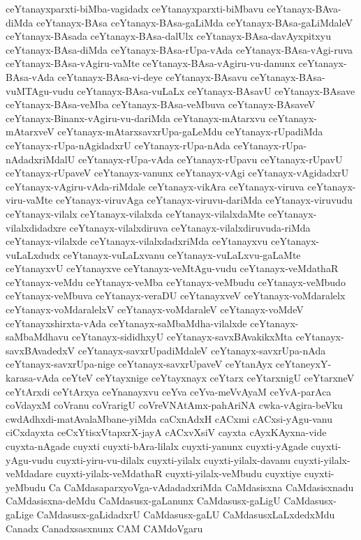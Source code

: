 {ceYtanayxparxti-biMba-vagidadx
ceYtanayxparxti-biMbavu
ceYtanayx-BAva-diMda
ceYtanayx-BAsa
ceYtanayx-BAsa-gaLiMda
ceYtanayx-BAsa-gaLiMdaleV
ceYtanayx-BAsada
ceYtanayx-BAsa-dalUlx
ceYtanayx-BAsa-davAyxpitxyu
ceYtanayx-BAsa-diMda
ceYtanayx-BAsa-rUpa-vAda
ceYtanayx-BAsa-vAgi-ruva
ceYtanayx-BAsa-vAgiru-vaMte
ceYtanayx-BAsa-vAgiru-vu-danunx
ceYtanayx-BAsa-vAda
ceYtanayx-BAsa-vi-deye
ceYtanayx-BAsavu
ceYtanayx-BAsa-vuMTAgu-vudu
ceYtanayx-BAsa-vuLaLx
ceYtanayx-BAsavU
ceYtanayx-BAsave
ceYtanayx-BAsa-veMba
ceYtanayx-BAsa-veMbuva
ceYtanayx-BAsaveV
ceYtanayx-Binanx-vAgiru-vu-dariMda
ceYtanayx-mAtarxvu
ceYtanayx-mAtarxveV
ceYtanayx-mAtarxsavxrUpa-gaLeMdu
ceYtanayx-rUpadiMda
ceYtanayx-rUpa-nAgidadxrU
ceYtanayx-rUpa-nAda
ceYtanayx-rUpa-nAdadxriMdalU
ceYtanayx-rUpa-vAda
ceYtanayx-rUpavu
ceYtanayx-rUpavU
ceYtanayx-rUpaveV
ceYtanayx-vanunx
ceYtanayx-vAgi
ceYtanayx-vAgidadxrU
ceYtanayx-vAgiru-vAda-riMdale
ceYtanayx-vikAra
ceYtanayx-viruva
ceYtanayx-viru-vaMte
ceYtanayx-viruvAga
ceYtanayx-viruvu-dariMda
ceYtanayx-viruvudu
ceYtanayx-vilalx
ceYtanayx-vilalxda
ceYtanayx-vilalxdaMte
ceYtanayx-vilalxdidadxre
ceYtanayx-vilalxdiruva
ceYtanayx-vilalxdiruvuda-riMda
ceYtanayx-vilalxde
ceYtanayx-vilalxdadxriMda
ceYtanayxvu
ceYtanayx-vuLaLxdudx
ceYtanayx-vuLaLxvanu
ceYtanayx-vuLaLxvu-gaLaMte
ceYtanayxvU
ceYtanayxve
ceYtanayx-veMtAgu-vudu
ceYtanayx-veMdathaR
ceYtanayx-veMdu
ceYtanayx-veMba
ceYtanayx-veMbudu
ceYtanayx-veMbudo
ceYtanayx-veMbuva
ceYtanayx-veraDU
ceYtanayxveV
ceYtanayx-voMdaralelx
ceYtanayx-voMdaralelxV
ceYtanayx-voMdaraleV
ceYtanayx-voMdeV
ceYtanayxshirxta-vAda
ceYtanayx-saMbaMdha-vilalxde
ceYtanayx-saMbaMdhavu
ceYtanayx-sididhxyU
ceYtanayx-savxBAvakikxMta
ceYtanayx-savxBAvadedxV
ceYtanayx-savxrUpadiMdaleV
ceYtanayx-savxrUpa-nAda
ceYtanayx-savxrUpa-nige
ceYtanayx-savxrUpaveV
ceYtanAyx
ceYtaneyxY-karasa-vAda
ceYteV
ceYtayxnige
ceYtayxnayx
ceYtarx
ceYtarxnigU
ceYtarxneV
ceYtArxdi
ceYtArxya
ceYnanayxvu
ceYva
ceYva-meVvAyaM
ceYvA-parAca
coVdayxM
coVranu
coVrarigU
coVreVNAtAmx-pahAriNA
cwka-vAgira-beVku
cwdAdhxdi-matAvalaMbane-yiMda
caCxnAdxH
cACxmi
cACxsi-yAgu-vanu
ciCxdayxta
ceCxYtisxVtapxrX-jayA
cACxvXsiV
cayxta
cAyxKAyxna-vide
cuyxta-nAgade
cuyxti
cuyxti-bAra-lilalx
cuyxti-yanunx
cuyxti-yAgade
cuyxti-yAgu-vudu
cuyxti-yiru-vu-dilalx
cuyxti-yilalx
cuyxti-yilalx-davanu
cuyxti-yilalx-veMdadare
cuyxti-yilalx-veMdathaR
cuyxti-yilalx-veMbudu
cuyxtiye
cuyxti-yeMbudu
Ca
CaMdasaparxyoVga-vAdadadxriMda
CaMdasisxna
CaMdasisxnadu
CaMdasisxna-deMdu
CaMdasusx-gaLanunx
CaMdasusx-gaLigU
CaMdasusx-gaLige
CaMdasusx-gaLidadxrU
CaMdasusx-gaLU
CaMdasusxLaLxdedxMdu
Canadx
Canadxsasxnunx
CAM
CAMdoVgaru
}
